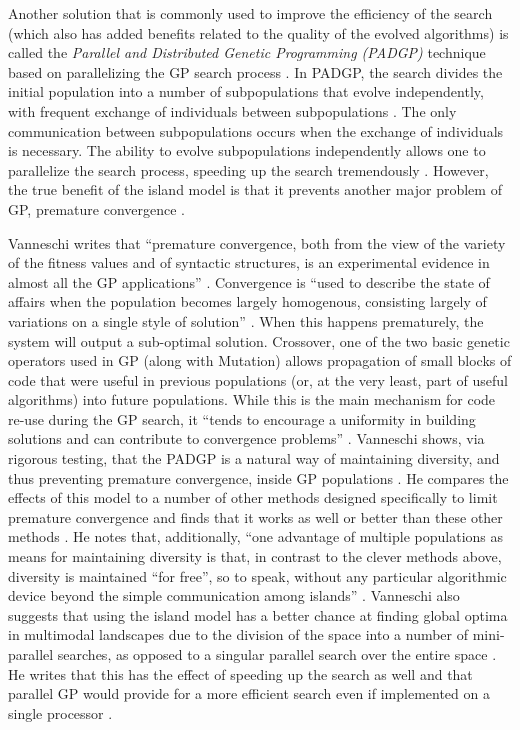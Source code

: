 \documentclass[12pt]{report} 	%
\numberwithin{figure}{chapter}
\numberwithin{table}{chapter}
\numberwithin{equation}{chapter}
\begin{document}
\begin{flushleft}
Another solution that is commonly used to improve the efficiency of the search (which also has added benefits related to the quality of the evolved algorithms) is called the \textit{Parallel and Distributed Genetic Programming (PADGP)} technique based on parallelizing the GP search process \cite[p. 13]{Vanneschi:2004le}. In PADGP, the search divides the initial population into a number of subpopulations that evolve independently, with frequent exchange of individuals between subpopulations \cite[p. 174]{Vanneschi:2004le}. The only communication between subpopulations occurs when the exchange of individuals is necessary. The ability to evolve subpopulations independently allows one to parallelize the search process, speeding up the search tremendously \cite[p. 173]{Vanneschi:2004le}. However, the true benefit of the island model is that it prevents another major problem of GP, premature convergence \cite[p. 15]{Vanneschi:2004le}.

Vanneschi writes that ``premature convergence, both from the view of the variety of the fitness values and of syntactic structures, is an experimental evidence in almost all the GP applications'' \cite[p. 15]{Vanneschi:2004le}. Convergence is ``used to describe the state of affairs when the population becomes largely homogenous, consisting largely of variations on a single style of solution'' \cite[p. 26]{Vanneschi:2004le}. When this happens prematurely, the system will output a sub-optimal solution. Crossover, one of the two basic genetic operators used in GP (along with Mutation) allows propagation of small blocks of code that were useful in previous populations (or, at the very least, part of useful algorithms) into future populations. While this is the main mechanism for code re-use during the GP search, it ``tends to encourage a uniformity in building solutions and can contribute to convergence problems'' \cite[p. 30]{Wehn:1998bh}. Vanneschi shows, via rigorous testing, that the PADGP is a natural way of maintaining diversity, and thus preventing premature convergence, inside GP populations \cite[p. 213]{Vanneschi:2004le}. He compares the effects of this model to a number of other methods designed specifically to limit premature convergence and finds that it works as well or better than these other methods \cite[p. 221]{Vanneschi:2004le}. He notes that, additionally, ``one advantage of multiple populations as means for maintaining diversity is that, in contrast to the clever methods above, diversity is maintained ``for free'', so to speak, without any particular algorithmic device beyond the simple communication among islands'' \cite[p. 213]{Vanneschi:2004le}. Vanneschi also suggests that using the island model has a better chance at finding global optima in multimodal landscapes due to the division of the space into a number of mini-parallel searches, as opposed to a singular parallel search over the entire space \cite[p. 192]{Vanneschi:2004le}. He writes that this has the effect of speeding up the search as well and that parallel GP would provide for a more efficient search even if implemented on a single processor \cite[p. 230]{Vanneschi:2004le}.


\end{flushleft}
\end{document}
